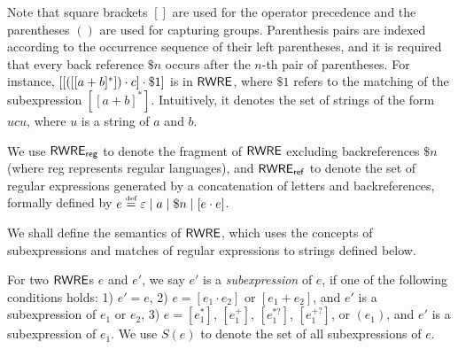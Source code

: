 Note that square brackets $[]$ are used for the operator precedence and the parentheses $()$ are used for capturing groups. 
%
Parenthesis pairs are indexed according to the occurrence sequence of their left parentheses, and it is required that every back reference $\$ n$ occurs  %
after the $n$-th pair of parentheses. For instance, $[[([[a+b]^*]) \cdot c] \cdot \$1]$ is in ${\sf RWRE}$, where $\$1$ refers to the matching of the subexpression $[[a+b]^*]$. Intuitively, it denotes the set of strings of the form $u c u$, where $u$ is a string of $a$ and $b$. 
  
We use ${\sf RWRE_{reg}}$ to denote the fragment of ${\sf RWRE}$ excluding  backreferences $\$ n$ (where {\sf reg} represents regular languages), and ${\sf RWRE_{ref}}$ to denote the set of regular expressions generated by a concatenation of letters and backreferences, formally %
defined by $e \eqdef \varepsilon \mid a \mid \$n \mid [e \concat e]$.  
  
  

We shall define the semantics of ${\sf RWRE}$, which uses the concepts of subexpressions and matches of regular expressions to strings defined below.
  
   For two ${\sf RWRE}$s $e$ and $e'$, we say $e'$ is a \emph{subexpression} of $e$,
  	if one of the following conditions holds: 1) $e'=e$, 2) $e = [e_1 \cdot e_2]$ or $[e_1 + e_2]$, and $e'$ is a subexpression of $e_1$ or $e_2$, 3) $e = [e_1^{\ast}]$, $[e_1^{+}]$, $[e_1^{\ast?}]$, $[e_1^{+?}]$, or $(e_1)$, and $e'$ is a subexpression of $e_1$. We use $S (e)$ to denote the set of all subexpressions of $e$. %
  
